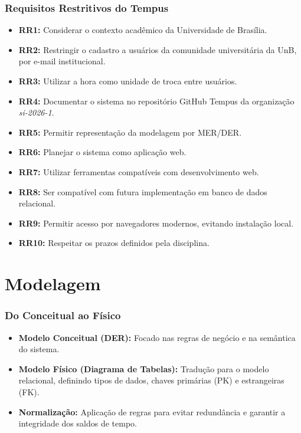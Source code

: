 \documentclass[aspectratio=169]{beamer}
\begin{document}
\begin{frame}
\frametitle{Requisitos Restritivos do Tempus}

\small
\begin{itemize}
    \item \textbf{RR1:} Considerar o contexto acadêmico da Universidade de Brasília.
    \item \textbf{RR2:} Restringir o cadastro a usuários da comunidade universitária da UnB, por e-mail institucional.
    \item \textbf{RR3:} Utilizar a hora como unidade de troca entre usuários.
    \item \textbf{RR4:} Documentar o sistema no repositório GitHub Tempus da organização \textit{si-2026-1}.
    \item \textbf{RR5:} Permitir representação da modelagem por MER/DER.
    \item \textbf{RR6:} Planejar o sistema como aplicação web.
    \item \textbf{RR7:} Utilizar ferramentas compatíveis com desenvolvimento web.
    \item \textbf{RR8:} Ser compatível com futura implementação em banco de dados relacional.
    \item \textbf{RR9:} Permitir acesso por navegadores modernos, evitando instalação local.
    \item \textbf{RR10:} Respeitar os prazos definidos pela disciplina.
\end{itemize}

\end{frame}

\section[Modelagem]{Modelagem}

\begin{frame}
\frametitle{Do Conceitual ao Físico}
\begin{itemize}
    \item \textbf{Modelo Conceitual (DER):} Focado nas regras de negócio e na semântica do sistema.
    \item \textbf{Modelo Físico (Diagrama de Tabelas):} Tradução para o modelo relacional, definindo tipos de dados, chaves primárias (PK) e estrangeiras (FK).
    \item \textbf{Normalização:} Aplicação de regras para evitar redundância e garantir a integridade dos saldos de tempo.
\end{itemize}
\end{frame}
\end{document}
